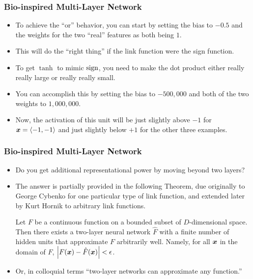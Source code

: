 \documentclass[trans]{beamer}
\begin{document}
\begin{frame}
  \frametitle{Bio-inspired Multi-Layer Network}
\begin{itemize}
\item
To achieve the ``or'' behavior, you can start by setting the bias to
$-0.5$ and the weights for the two ``real'' features as both being
$1$.
\item This will do the ``right thing''
if the link function were the sign function.
\item  To get $\tanh$ to mimic $\textrm{sign}$, you need to make the dot
product either really really large or really really small.  
\item You can
accomplish this by setting the bias to $-500,000$ and both of the two
weights to $1,000,000$.
\item  Now, the activation of this unit will be just
slightly above $-1$ for ${\boldsymbol{x}} = \langle -1,-1 \rangle$ and just
slightly below $+1$ for the other three examples.
\end{itemize}
\end{frame}

\begin{frame}
  \frametitle{Bio-inspired Multi-Layer Network}
\begin{itemize}
\item
Do you get additional
representational power by moving beyond two layers?  
\item The answer is
partially provided in the following Theorem, due originally to George
Cybenko for one particular type of link function, and extended later
by Kurt Hornik to arbitrary link functions.
\begin{theorem} \label{thm:nnet:twolayer}
%
  Let $F$ be a continuous function on a bounded subset of
  $D$-dimensional space.  Then there exists a two-layer neural network
  $\hat F$ with a finite number of hidden units that approximate $F$
  arbitrarily well.  Namely, for all ${\boldsymbol{x}}$ in the domain of $F$,
  $\left\vert F({\boldsymbol{x}}) - \hat F({\boldsymbol{x}}) \right\vert < \epsilon$.
\end{theorem}
\item
Or, in colloquial terms ``two-layer networks can approximate any
function.''
\end{itemize}
\end{frame}
\end{document}
